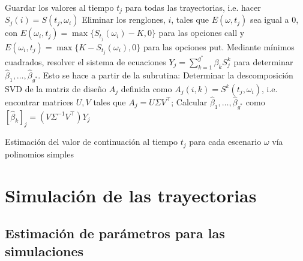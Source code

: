 \documentclass[11pt]{article}
\begin{document}
\begin{algorithm}[H]
\DontPrintSemicolon
\SetAlgoLined
{}
\BlankLine
Guardar los valores al tiempo $t_j$ para todas las trayectorias, i.e. hacer $S_j(i)=S(t_j,\omega_i)$\;
Eliminar los renglones, $i$, tales que $E(\omega,t_j)$ sea igual a 0, con $E(\omega_i,t_j)=\max\{S_{t_j}(\omega_i)-K,0\}$ para las opciones call y $E(\omega_i,t_j)=\max\{K-S_{t_j}(\omega_i),0\}$ para las opciones put.\;
Mediante mínimos cuadrados, resolver el sistema de ecuaciones $Y_j = \sum_{k=1}^{g^*} \beta_k S_j^k$ para determinar $\hat{\beta}_1,\ldots,\hat{\beta}_{g^*}$. Esto se hace a partir de la subrutina:\;
Determinar la descomposición SVD de la matriz de diseño $A_j$ definida como $A_j(i,k)=S^k(t_j,\omega_i)$, i.e. encontrar matrices $U,V$ tales que $A_j = U\Sigma V^{\top}$;
Calcular $\hat{\beta}_1,\ldots,\hat{\beta}_{g^*}$ como $[\hat{\beta}_k]_j = (V\Sigma^{-1}V^{\top})Y_j$\;
\caption{Estimación del valor de continuación al tiempo $t_j$ para cada escenario $\omega$ vía polinomios simples}
\end{algorithm}

\section{Simulación de las trayectorias}

\subsection{Estimación de parámetros para las simulaciones}
\end{document}
